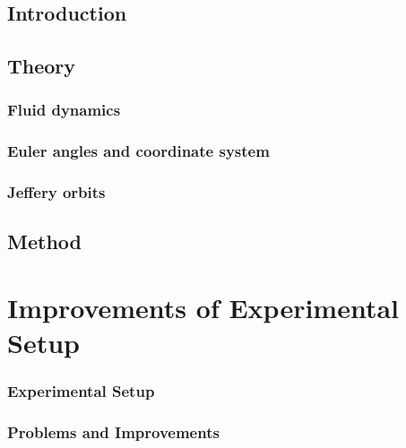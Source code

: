\documentclass[]{report}
\begin{document}


\doublespacing



\newpage
{}
\setcounter{page}{1}
\pagestyle{fancy}
\setspecialhdr
\tableofcontents


\newpage
\setdefaulthdr
{}	
\setcounter{page}{1}

\chapter{Introduction}



\chapter{Theory}


\section{Fluid dynamics}


\section{Euler angles and coordinate system}


\section{Jeffery orbits}


\chapter{Method}
\part{Improvements of Experimental Setup}
\section{Experimental Setup}

\section{Problems and Improvements}

\end{document}
